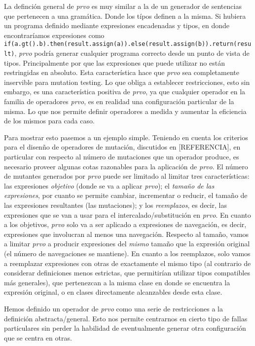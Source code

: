 La definci\'on general de \emph{prvo} es muy similar a la de un generador de sentencias que pertenecen a una gram\'atica. Donde los t\'ipos definen a la misma. Si hubiera un programa definido mediante expresiones encadenadas y tipos, en donde encontrar\'iamos expresiones como \lstinline|if(a.gt().b).then(result.assign(a)).else(result.assign(b)).return(result)|, \emph{prvo} podr\'ia generar cualquier programa correcto desde un punto de vista de tipos. Principalmente por que las expresiones que puede utilizar no est\'an restringidas en absoluto. Esta caracter\'istica hace que \emph{prvo} sea completamente inservible para mutation testing. Lo que obliga a establecer restricciones, esto sin embargo, es una caracter\'istica positiva de \emph{prvo}, ya que cualquier operador en la familia de operadores \emph{prvo}, es en realidad una configuraci\'on particular de la misma. Lo que nos permite definir operadores a medida y aumentar la eficiencia de los mismos para cada caso.

Para mostrar esto pasemos a un ejemplo simple. Teniendo en cuenta los criterios para el disen\~no de operadores de mutaci\'on, discutidos en [REFERENCIA], en particular con respecto al n\'umero de mutaciones que un operador produce, es necesario proveer algunas cotas razonables para la aplicaci\'on de \emph{prvo}. El n\'umero de mutantes generados por \emph{prvo} puede ser limitado al limitar tres caracter\'isticas: las expresiones \emph{objetivo} (donde se va a aplicar \emph{prvo}); el \emph{tama\~no de las expresiones}, por cuanto se permite cambiar, incrementar o reducir, el tama\~no de las expresiones resultantes (las mutaciones); y los \emph{reemplazos}, es decir, las expresiones que se van a usar para el intercalado/substituci\'on en \emph{prvo}. En cuanto a los objetivos, \emph{prvo} solo va a ser aplicado a expresiones de navegaci\'on, es decir, expresiones que involucran al menos una navegaci\'on. Respecto al tama\~no, vamos a limitar \emph{prvo} a producir expresiones del \emph{mismo} tama\~no que la expresi\'on original (el n\'umero de navegaciones se mantiene). En cuanto a los reemplazos, solo vamos a reemplazar expresiones con otras de exactamente el mismo tipo (al contrario de considerar definiciones menos estrictas, que permitir\'ian utilizar tipos compatibles m\'as generales), que pertenezcan a la misma clase en donde se encuentra la expresi\'on original, o en clases directamente alcanzables desde esta clase.

Hemos definido un operador de \emph{prvo} como una serie de restricciones a la definici\'on abstracta/general. Esto nos permite centrarnos en cierto tipo de fallas particulares sin perder la habilidad de eventualmente generar otra configuraci\'on que se centra en otras.

